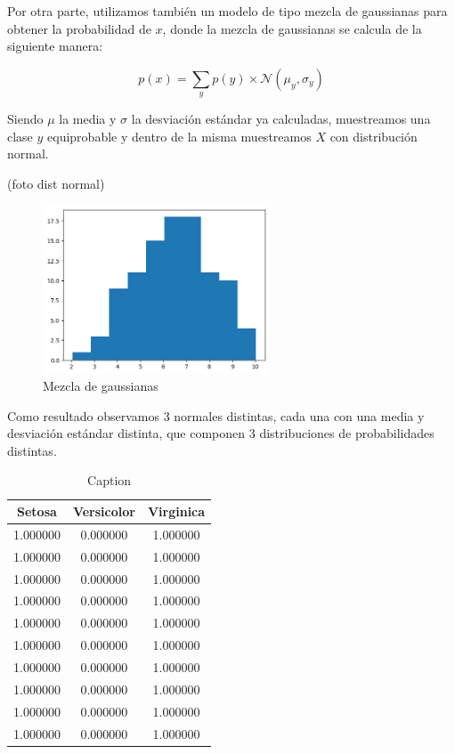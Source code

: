 \documentclass[11pt]{article}
\begin{document}
Por otra parte, utilizamos también un modelo de tipo mezcla de gaussianas para obtener la probabilidad de $x$, donde la mezcla de gaussianas se calcula de la siguiente manera:

$$
p(x) = \sum_y p(y) \times \mathcal{N}(\mu_y, \sigma_y)
$$ 

Siendo $\mu$ la media y $\sigma$ la desviación estándar ya calculadas, muestreamos una clase $y$ equiprobable y dentro de la misma muestreamos $X$ con distribución normal. 

(foto dist normal)
\begin{figure}[h]
    \centering
    \includegraphics[width=0.6\textwidth]{notebooks_clase_1/mix_gaussians.png}
    \caption{Mezcla de gaussianas}
    \label{fig:mix-gaussians}
\end{figure}

Como resultado observamos 3 normales distintas, cada una con una media y desviación estándar distinta, que componen 3 distribuciones de probabilidades distintas. 


\begin{table}[h]
\centering
\begin{tabular}{c|c|c}
\textbf{Setosa}                   & \textbf{Versicolor}               &  \textbf{Virginica} \\ \hline \hline
        1.000000 & 0.000000 & 1.000000 \\
        1.000000 & 0.000000 & 1.000000 \\
        1.000000 & 0.000000 & 1.000000 \\
        1.000000 & 0.000000 & 1.000000 \\
        1.000000 & 0.000000 & 1.000000 \\
        1.000000 & 0.000000 & 1.000000 \\
        1.000000 & 0.000000 & 1.000000 \\
        1.000000 & 0.000000 & 1.000000 \\
        1.000000 & 0.000000 & 1.000000 \\
        1.000000 & 0.000000 & 1.000000 \\
    \end{tabular}
    \caption{Caption}
    \label{tab:my_label}
\end{table}
\end{document}
